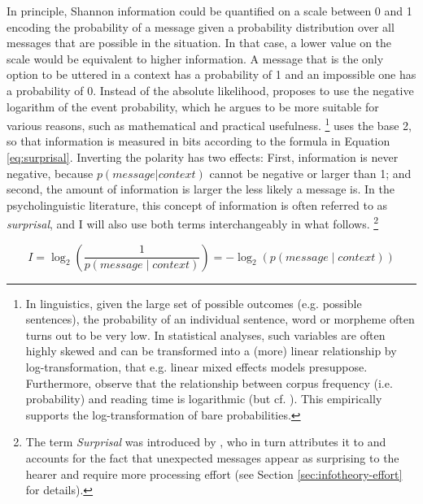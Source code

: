 In principle, Shannon information could be quantified on a scale between 0 and 1 encoding the probability of a message given a probability distribution over all messages that are possible in the situation. In that case, a lower value on the scale would be equivalent to higher information. A message that is the only option to be uttered in a context has a probability of 1 and an impossible one has a probability of 0. Instead of the absolute likelihood, \citeauthor{shannon1948} proposes to use the negative logarithm of the event probability, which he argues to be more suitable for various reasons, such as mathematical and practical usefulness.%
%
\footnote{In linguistics, given the large set of possible outcomes (e.g. possible sentences), the probability of an individual sentence, word or morpheme often turns out to be very low. In statistical analyses, such variables are often highly skewed and can be transformed into a (more) linear relationship by log-transformation, that e.g. linear mixed effects models \citep{bates.etal2015} presuppose. Furthermore, \citet{smith.levy2013}  observe that the relationship between corpus frequency (i.e. probability) and reading time is logarithmic (but cf. \citet{brothers.kuperberg2019}). This empirically supports the log-transformation of bare probabilities.  }\afterfn%
%
\citeauthor{shannon1948} uses the base 2, so that information is measured in bits according to the formula in Equation \ref{eq:surprisal}. Inverting the polarity has two effects: First, information is never negative, because $p(message|context)$ cannot be negative or larger than 1; and second, the amount of information is larger the less likely a message is. In the psycholinguistic literature, this concept of information is often referred to as \textit{surprisal}, and I will also use both terms interchangeably in what follows.%
%
\footnote{The term \textit{Surprisal} was introduced by \citet{hale2001}, who in turn attributes it to \citet{attneave1959} and accounts for the fact that unexpected messages appear as surprising to the hearer and require more processing effort (see Section \ref{sec:infotheory-effort} for details).}\afterfn%

\begin{equation}
I = \log_2 \left(\frac{1}{p(message\mathbin{|}context)}\right) = - \log_2 \left( p(message\mathbin{|}context) \right) \label{eq:surprisal}
\end{equation}

